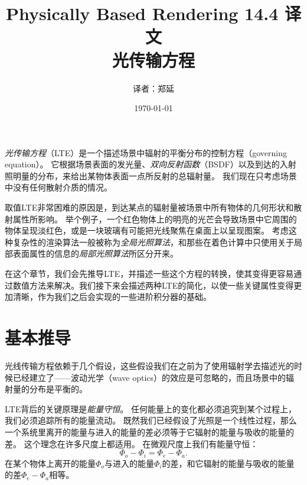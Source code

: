 \documentclass[a4paper]{article}
\title{Physically Based Rendering 14.4 译文\\
光传输方程}
\date{\today}
\author{译者：郑延}
\begin{document}
	\maketitle
	\newpage
	\textit{光传输方程}（LTE）是一个描述场景中辐射的平衡分布的控制方程（governing equation）。
	它根据场景表面的发光量、\textit{双向反射函数}（BSDF）以及到达的入射照明量的分布，来给出某物体表面一点所反射的总辐射量。
	我们现在只考虑场景中没有任何散射介质的情况。

	取值LTE非常困难的原因是，到达某点的辐射量被场景中所有物体的几何形状和散射属性所影响。
	举个例子，一个红色物体上的明亮的光芒会导致场景中它周围的物体呈现淡红色，或是一块玻璃有可能把光线聚焦在桌面上以呈现图案。
	考虑这种复杂性的渲染算法一般被称为\textit{全局光照算法}，和那些在着色计算中只使用关于局部表面属性的信息的\textit{局部光照算法}所区分开来。

	在这个章节，我们会先推导LTE，并描述一些这个方程的转换，使其变得更容易通过数值方法来解决。我们接下来会描述两种LTE的简化，以使一些关键属性变得更加清晰，作为我们之后会实现的一些进阶积分器的基础。

	\section{基本推导}
	光线传输方程依赖于几个假设，这些假设我们在之前为了使用辐射学去描述光的时候已经建立了——波动光学（wave optics）的效应是可忽略的，而且场景中的辐射量的分布是平衡的。

	LTE背后的关键原理是\textit{能量守恒}。
	任何能量上的变化都必须追究到某个过程上，我们必须追踪所有的能量流动。
	既然我们已经假设了光照是一个线性过程，那么一个系统里离开的能量与进入的能量的差必须等于它辐射的能量与吸收的能量的差。
	这个理念在许多尺度上都适用。
	在微观尺度上我们有能量守恒：
	\begin{equation*}
		\Phi_o - \Phi_i = \Phi_e - \Phi_a.
	\end{equation*}
	在某个物体上离开的能量$\Phi_{o}$与进入的能量$\Phi_i$的差，和它辐射的能量与吸收的能量的差$\Phi_e - \Phi_a$相等。
\end{document}
